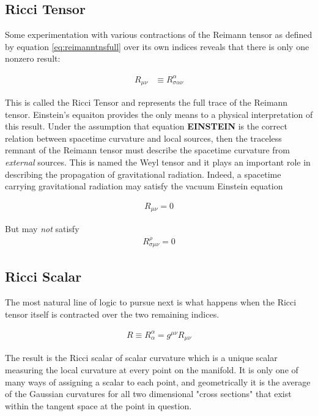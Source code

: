 \subsection{Ricci Tensor}

Some experimentation with various contractions of the Reimann tensor as defined by equation \ref{eq:reimanntnsfull} over its own indices reveals that there is only one nonzero result:

\begin{align}
R_{\mu \nu} &\equiv R^\alpha_{\sigma \alpha \nu}
\end{align} 

This is called the Ricci Tensor and represents the full trace of the Reimann tensor. Einstein's equaiton provides the only means to a physical interpretation of this result. Under the assumption that equation \textbf{EINSTEIN} is the correct relation between spacetime curvature and local sources, then the traceless remnant of the Reimann tensor must describe the spacetime curvature from \textit{external} sources. This is named the Weyl tensor and it plays an important role in describing the propagation of gravitational radiation. Indeed, a spacetime carrying gravitational radiation may satisfy the vacuum Einstein equation 

\begin{align}
R_{\mu \nu} = 0
\end{align}

But may \textit{not} satisfy
\begin{align}
R^\rho_{\sigma \mu \nu} = 0
\end{align}

\subsection{Ricci Scalar}

The most natural line of logic to pursue next is what happens when the Ricci tensor itself is contracted over the two remaining indices. 

\begin{align}
R \equiv R^{\alpha}_{\alpha} = g^{\mu \nu}R_{\mu \nu}
\end{align}

The result is the Ricci scalar of scalar curvature which is a unique scalar measuring the local curvature at every point on the manifold. It is only one of many ways of assigning a scalar to each point, and geometrically it is the average of the Gaussian curvatures for all two dimensional "cross sections" that exist within the tangent space at the point in question.  

